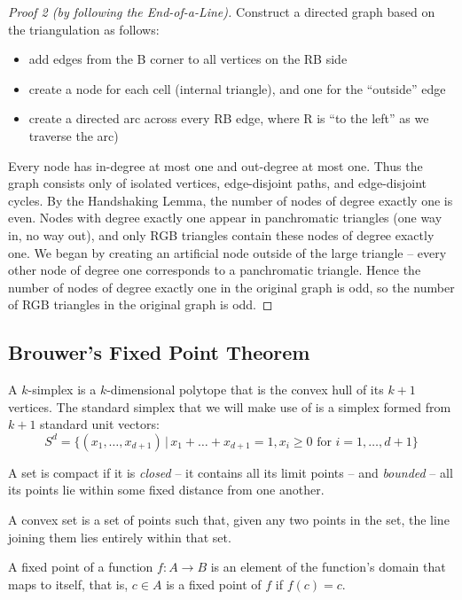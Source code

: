 	\begin{proof}[Proof 2 \emph{(by following the End-of-a-Line)}]
		Construct a directed graph based on the triangulation as follows:
		\begin{itemize}
			\item add edges from the B corner to all vertices on the RB side
			\item create a node for each cell (internal triangle), and one for
				the ``outside'' edge
			\item create a directed arc across every RB edge, where R is ``to
				the left'' as we traverse the arc)
		\end{itemize}

		Every node has in-degree at most one and out-degree at most one. Thus
		the graph consists only of isolated vertices, edge-disjoint paths, and
		edge-disjoint cycles. By the Handshaking Lemma, the number of nodes of
		degree exactly one is even. Nodes with degree exactly one appear 
		in panchromatic triangles (one way in, no way out), and only RGB
		triangles contain these nodes of degree exactly one. We began by
		creating an artificial node outside of the large triangle -- every
		other node of degree one corresponds to a panchromatic triangle. Hence
		the number of nodes of degree exactly one in the original graph is odd,
		so the number of RGB triangles in the original graph is odd.
	\end{proof}

	\subsection{Brouwer's Fixed Point Theorem}
	A $k$-simplex is a $k$-dimensional polytope that is the convex hull of its
	$k+1$ vertices. The standard simplex that we will make use of is a simplex
	formed from $k+1$ standard unit vectors:
	\begin{equation}
		S^d = \{ (x_1, \ldots, x_{d+1}) \, | \, x_1 + \ldots + x_{d+1} = 1, x_i
		\ge 0 \text{ for } i = 1, \ldots, d+1 \}
	\end{equation}

	A set is compact if it is \textit{closed} -- it contains all its limit
	points -- and \textit{bounded} -- all its points lie within some fixed
	distance from one another.

	A convex set is a set of points such that, given any two points in the set,
	the line joining them lies entirely within that set.

	A fixed point of a function $f: A \rightarrow B$ is an element of the
	function's domain that maps to itself, that is, $c \in A$ is a fixed point
	of $f$ if $f(c) = c$.

